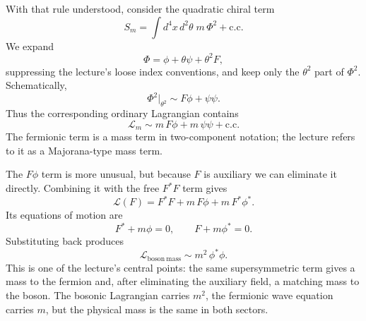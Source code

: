 With that rule understood, consider the quadratic chiral term
\begin{equation}
S_m=\int d^4x\,d^2\theta\;m\,\Phi^2+\mathrm{c.c.}
\end{equation}
We expand
\begin{equation}
\Phi=\phi+\theta\psi+\theta^2 F,
\end{equation}
suppressing the lecture's loose index conventions, and keep only the \(\theta^2\) part of \(\Phi^2\). Schematically,
\begin{equation}
\Phi^2\big|_{\theta^2}\sim F\phi+\psi\psi.
\end{equation}
Thus the corresponding ordinary Lagrangian contains
\begin{equation}
\mathcal L_m\sim m\,F\phi + m\,\psi\psi + \mathrm{c.c.}
\end{equation}
The fermionic term is a mass term in two-component notation; the lecture refers to it as a Majorana-type mass term.

The \(F\phi\) term is more unusual, but because \(F\) is auxiliary we can eliminate it directly. Combining it with the free \(F^\ast F\) term gives
\begin{equation}
\mathcal L(F)
=
F^\ast F
+
m\,F\phi
+
m\,F^\ast \phi^\ast .
\end{equation}
Its equations of motion are
\begin{equation}
F^\ast + m\phi =0,
\qquad
F + m\phi^\ast =0.
\end{equation}
Substituting back produces
\begin{equation}
\mathcal L_{\mathrm{boson\ mass}} \sim m^2\,\phi^\ast\phi.
\end{equation}
This is one of the lecture's central points: the same supersymmetric term gives a mass to the fermion and, after eliminating the auxiliary field, a matching mass to the boson. The bosonic Lagrangian carries \(m^2\), the fermionic wave equation carries \(m\), but the physical mass is the same in both sectors.

